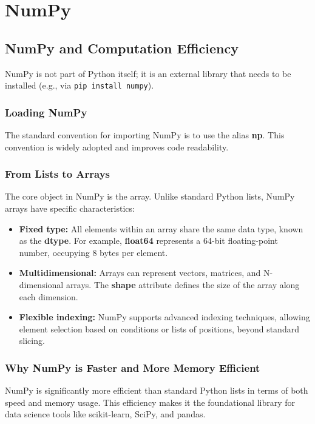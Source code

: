 \chapter{NumPy}
\section{NumPy and Computation Efficiency}
NumPy is not part of Python itself; it is an external library that needs to be installed (e.g., via \texttt{pip install numpy}).

\subsection{Loading NumPy}
The standard convention for importing NumPy is to use the alias \textbf{np}. This convention is widely adopted and improves code readability.



\subsection{From Lists to Arrays}
The core object in NumPy is the array. Unlike standard Python lists, NumPy arrays have specific characteristics:
\begin{itemize}
    \item \textbf{Fixed type:} All elements within an array share the same data type, known as the \textbf{dtype}. For example, \textbf{float64} represents a 64-bit floating-point number, occupying 8 bytes per element.
    \item \textbf{Multidimensional:} Arrays can represent vectors, matrices, and N-dimensional arrays. The \textbf{shape} attribute defines the size of the array along each dimension.
    \item \textbf{Flexible indexing:} NumPy supports advanced indexing techniques, allowing element selection based on conditions or lists of positions, beyond standard slicing.
\end{itemize}




\subsection{Why NumPy is Faster and More Memory Efficient}
NumPy is significantly more efficient than standard Python lists in terms of both speed and memory usage. This efficiency makes it the foundational library for data science tools like scikit-learn, SciPy, and pandas.

